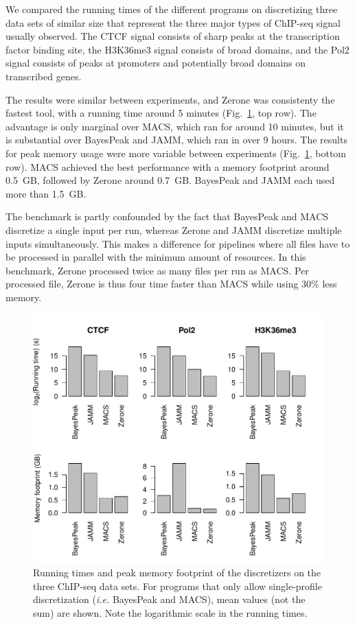 \documentclass{bioinfo}
\begin{document}
We compared the running times of the different programs on discretizing
three data sets of similar size that represent the three major types of
ChIP-seq signal usually observed. The CTCF signal consists of sharp
peaks at the transcription factor binding site, the H3K36me3 signal
consists of broad domains, and the Pol2 signal consists of  peaks
at promoters and potentially broad domains on transcribed genes.

The results were similar between experiments, and Zerone was
consistenty the fastest tool, with a running time around 5 minutes
(Fig.~\ref{fig:perf}, top row). The advantage is only marginal over
MACS, which ran for around 10 minutes, but it is substantial over
BayesPeak and JAMM, which ran in over 9 hours. The results for peak
memory usage were more variable between experiments (Fig.~\ref{fig:perf},
bottom row). MACS achieved the best performance with a memory
footprint around 0.5~GB, followed by Zerone around 0.7~GB.
BayesPeak and JAMM each used more than 1.5~GB.

The benchmark is partly confounded by the fact that BayesPeak and MACS
discretize a single input per run, whereas Zerone and JAMM discretize
multiple inputs simultaneously. This makes a difference for pipelines
where all files have to be processed in parallel with the minimum
amount of resources. In this benchmark, Zerone processed twice as
many files per run as MACS. Per processed file, Zerone is thus
four time faster than MACS while using 30\% less memory.

\begin{figure}[!tpb]
\centerline{\includegraphics[scale=0.5]{performance.pdf}}
\caption{
  Running times and peak memory footprint of the
  discretizers on the three ChIP-seq data sets. For programs that only
  allow single-profile discretization (\textit{i.e.} BayesPeak and MACS),
  mean values (not the sum) are shown. Note the logarithmic scale in the
  running times.
}\label{fig:perf}
\end{figure}
\end{document}
